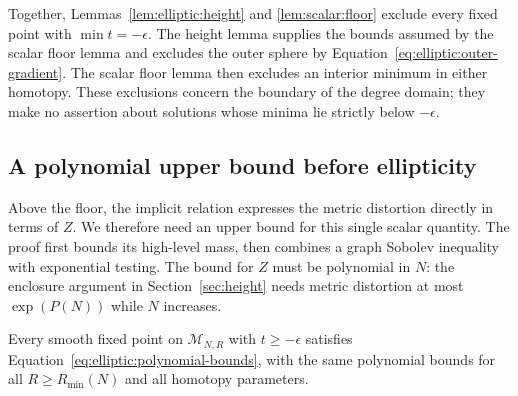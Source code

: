 Together, Lemmas~\ref{lem:elliptic:height} and
\ref{lem:scalar:floor} exclude every fixed point with
$\min t=-\epsilon$.  The height lemma supplies the bounds assumed by
the scalar floor lemma and excludes the outer sphere by
Equation~\eqref{eq:elliptic:outer-gradient}.  The scalar floor lemma
then excludes an interior minimum in either homotopy.  These
exclusions concern the boundary of the degree domain; they make no
assertion about solutions whose minima lie strictly below $-\epsilon$.

\subsection{A polynomial upper bound before ellipticity}

Above the floor, the implicit relation expresses the metric distortion
directly in terms of $Z$.  We therefore need an upper bound for this
single scalar quantity.  The proof first bounds its high-level mass,
then combines a graph Sobolev inequality with exponential testing.
The bound for $Z$ must be polynomial in $N$: the enclosure argument
in Section~\ref{sec:height} needs metric distortion at most
$\exp(P(N))$ while $N$ increases.

\begin{proposition}\label{prop:elliptic:upper}
Every smooth fixed point on $\mathcal M_{N,R}$ with $t\ge-\epsilon$
satisfies Equation~\eqref{eq:elliptic:polynomial-bounds}, with the same
polynomial bounds for all $R\ge R_{\min}(N)$ and all homotopy parameters.
\end{proposition}

